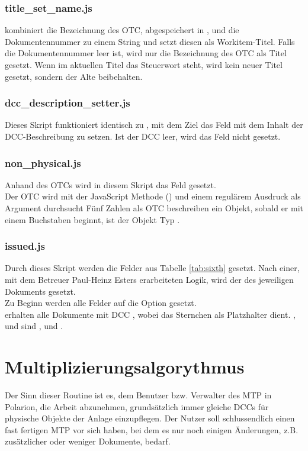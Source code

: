 \subsubsection{title\_set\_name.js}
\label{sub:titleset}
 kombiniert die Bezeichnung des OTC, abgespeichert in , und die Dokumentennummer zu einem String und setzt diesen als Workitem-Titel.
Falls die Dokumentennummer leer ist, wird nur die Bezeichnung des OTC als Titel gesetzt.
Wenn im aktuellen Titel das Steuerwort  steht, wird kein neuer Titel gesetzt, sondern der Alte beibehalten.
\subsubsection{dcc\_description\_setter.js}
\label{sub:dccdes}
Dieses Skript funktioniert identisch zu , mit dem Ziel das Feld  mit dem Inhalt der DCC-Beschreibung zu setzen. Ist der DCC leer, wird das Feld nicht gesetzt.
\subsubsection{non\_physical.js}
\label{sub:physicl}
Anhand des OTCs wird in diesem Skript das Feld  gesetzt.\\
Der OTC wird mit der JavaScript Methode  (\cite{16}) und einem regulärem Ausdruck als Argument durchsucht
Fünf Zahlen als OTC beschreiben ein  Objekt, sobald er mit einem Buchstaben beginnt, ist der Objekt Typ . 
\subsubsection{issued.js}
\label{sub:issued}
Durch dieses Skript werden die Felder aus Tabelle \ref{tab:sixth} gesetzt. Nach einer, mit dem Betreuer Paul-Heinz Esters erarbeiteten Logik, wird der  des jeweiligen Dokuments gesetzt.\\
Zu Beginn werden alle Felder auf die Option  gesetzt.\\
 erhalten alle Dokumente mit DCC , wobei das Sternchen als Platzhalter dient.
, und  sind ,  und  .
\newpage
\section{Multiplizierungsalgorythmus}
\label{sec:algo}
Der Sinn dieser Routine ist es, dem Benutzer bzw. Verwalter des MTP in Polarion, die Arbeit abzunehmen, grundsätzlich immer gleiche DCCs für physische Objekte der Anlage einzupflegen. Der Nutzer soll schlussendlich einen fast fertigen MTP vor sich haben, bei dem es nur noch einigen Änderungen, z.B. zusätzlicher oder weniger Dokumente, bedarf. 
